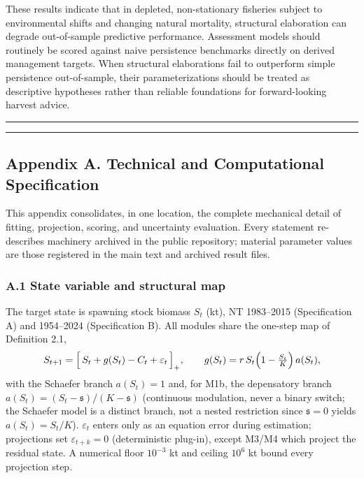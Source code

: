 \documentclass[11pt]{article}
\begin{document}
These results indicate that in depleted, non-stationary fisheries
subject to environmental shifts and changing natural mortality,
structural elaboration can degrade out-of-sample predictive performance.
Assessment models should routinely be scored against naive persistence
benchmarks directly on derived management targets. When structural
elaborations fail to outperform simple persistence out-of-sample, their
parameterizations should be treated as descriptive hypotheses rather
than reliable foundations for forward-looking harvest advice.

\begin{center}\rule{0.5\linewidth}{0.5pt}\end{center}

\begin{center}\rule{0.5\linewidth}{0.5pt}\end{center}

\subsection{Appendix A. Technical and Computational
Specification}\label{appendix-a.-technical-and-computational-specification}

This appendix consolidates, in one location, the complete mechanical
detail of fitting, projection, scoring, and uncertainty evaluation.
Every statement re-describes machinery archived in the public
repository; material parameter values are those registered in the main
text and archived result files.

\subsubsection{A.1 State variable and structural
map}\label{a.1-state-variable-and-structural-map}

The target state is spawning stock biomass \(S_t\) (kt), NT 1983--2015
(Specification A) and 1954--2024 (Specification B). All modules share
the one-step map of Definition 2.1,
\[S_{t+1} = \Big[\, S_t + g(S_t) - C_t + \varepsilon_t \,\Big]_+, \qquad g(S_t) = r\, S_t \Bigl(1 - \tfrac{S_t}{K}\Bigr)\, a(S_t),\]
with the Schaefer branch \(a(S_t)=1\) and, for M1b, the depensatory
branch \(a(S_t)=(S_t - \mathfrak{s})/(K - \mathfrak{s})\) (continuous
modulation, never a binary switch; the Schaefer model is a distinct
branch, not a nested restriction since \(\mathfrak{s}=0\) yields
\(a(S_t)=S_t/K\)). \(\varepsilon_t\) enters only as an equation error
during estimation; projections set \(\varepsilon_{t+k}=0\)
(deterministic plug-in), except M3/M4 which project the residual state.
A numerical floor \(10^{-3}\) kt and ceiling \(10^{6}\) kt bound every
projection step.
\end{document}
